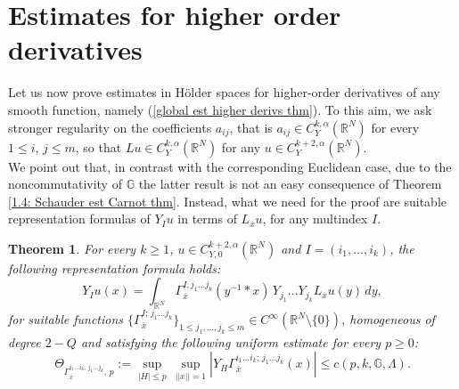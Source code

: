\documentclass{article}
\newtheorem{theorem}{Theorem}[section]
\numberwithin{equation}{section}
\begin{document}
\vspace{2mm}

\section{Estimates for higher order derivatives}
\label{sec 4}
    Let us now prove estimates in Hölder spaces for higher-order derivatives of any smooth function, namely (\ref{global est higher derivs thm}). To this aim, we ask stronger regularity on the coefficients $a_{ij}$, that is $a_{ij} \in C^{k,\alpha}_Y(\mathbb{R}^N)$ for every $1 \leq i, \, j \leq m$, so that $Lu \in C^{k,\alpha}_Y(\mathbb{R}^N)$ for any $u \in C^{k+2,\alpha}_Y(\mathbb{R}^N)$.
\\
We point out that, in contrast with the corresponding Euclidean case, due to the noncommutativity of $\mathbb{G}$ the latter result is not an easy consequence of Theorem \ref{1.4: Schauder est Carnot thm}. 
Instead, what we need for the proof are suitable representation formulas of $Y_I u$ in terms of $L_{\overline{x}} u$, for any multindex $I$. 

\vspace{2mm}

\begin{theorem}
\label{rep formula higher derivs with Gamma^J}
    For every $k \geq 1$, $u \in C^{k+2,\alpha}_{Y,0}(\mathbb{R}^N)$ and $I=(i_1,...,i_k)$, the following representation formula holds:
    \begin{equation}
    \label{rep formula Y_I u}
        Y_I u(x) = \int_{\mathbb{R}^N} \Gamma_{\overline{x}}^{I,j_1...j_k}(y^{-1} * x) \, Y_{j_1}...Y_{j_k} L_{\overline{x}} u(y) \, dy,
    \end{equation}
    for suitable functions $\{\Gamma_{\overline{x}}^{I; \, j_1...j_k}\}_{1 \leq j_1,...,j_k \leq m} \in C^{\infty}(\mathbb{R}^N \setminus \{0\})$,  homogeneous of degree $2-Q$ and satisfying the following uniform estimate for every $p \geq 0$:
    \begin{equation}
        \label{uniform estimates for Gamma^J} \Theta_{\Gamma_{\overline{x}}^{i_1...i_k; \, j_1...j_k}, \, p} := \sup_{|H| \leq p} \, \sup_{||x||=1} |Y_H  \Gamma_{\overline{x}}^{i_1...i_k; \, j_1...j_k}(x)| \leq c(p,k,\mathbb{G}, \Lambda).
    \end{equation}
\end{theorem}

\vspace{2mm}
\end{document}
